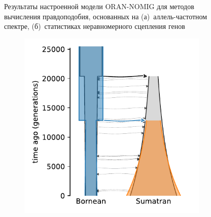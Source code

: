 \begin{figure}[ht]
\begin{subfigure}[b]{0.24\linewidth}
        \caption{}
        \label{fig:part2:experiments:sim2:results:oran_nomig_ld}
    \end{subfigure}
    \caption{Результаты настроенной модели ORAN-NOMIG для методов вычисления правдоподобия, основанных на (а)~аллель-частотном спектре, (б)~статистиках неравномерного сцепления генов}
    \label{fig:part2:experiments:sim2:results:oran_nomig}
\end{figure}

\begin{figure}[ht]
    \centering
    \begin{subfigure}[b]{0.24\linewidth}
        \centering
        \includegraphics[width=\textwidth]{images_experiments/suimulation_2_stdpopsim/ORAN-STRUCT-NOMIG/dadi.pdf}
        \caption{}
        \label{fig:part2:experiments:sim2:results:oran_struct_nomig_dadi}
    \end{subfigure}%
    \begin{subfigure}[b]{0.24\linewidth}
        \centering

\end{subfigure}
\end{figure}
